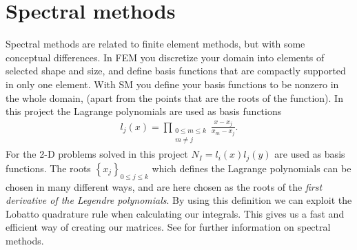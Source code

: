 \section{Spectral methods}
Spectral methods are related to finite element methods, but with some conceptual differences. In FEM you discretize your domain into elements of selected shape and size, and define basis functions that are compactly supported in only one element. With SM you define your basis functions to be nonzero in the whole domain, (apart from the points that are the roots of the function). In this project the Lagrange polynomials are used as basis functions
%
\begin{align}
	l_j(x) = \prod_{\substack{0\leq m \leq k \\  m \neq j}} \frac{x-x_j}{x_m-x_j}.
	\label{eq:lagpolynomials}
\end{align}
For the 2-D problems solved in this project $N_I = l_i(x)l_j(y)$ are used as basis functions.
The roots $\left\{ x_j \right\}_{0\leq j \leq k}$ which defines the Lagrange polynomials can be chosen in many different ways, and are here chosen as the roots of the \textit{first derivative of the Legendre polynomials}. By using this definition we can exploit the Lobatto quadrature rule when calculating our integrals. This gives us a fast and efficient way of creating our matrices. See \cite{Canuto} for further information on spectral methods.
